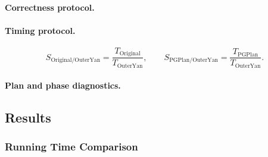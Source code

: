 \paragraph{Correctness protocol.}

\paragraph{Timing protocol.}

\begin{equation}
  S_{\mathrm{Original}/\mathrm{OuterYan}}
  = \frac{T_{\mathrm{Original}}}{T_{\mathrm{OuterYan}}},
  \qquad
  S_{\mathrm{PGPlan}/\mathrm{OuterYan}}
  = \frac{T_{\mathrm{PGPlan}}}{T_{\mathrm{OuterYan}}}.
  \label{eq:reported-speedups}
\end{equation}

\paragraph{Plan and phase diagnostics.}

\subsection{Results}
\label{sec:experimental-results}


\subsubsection{Running Time Comparison}
\label{sec:runtime-comparison}

